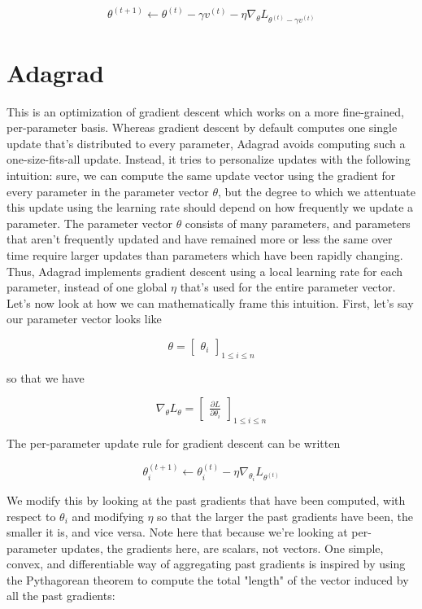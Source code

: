 \documentclass{article}
\begin{document}
    $$ \theta^{(t + 1)} \gets \theta^{(t)} - \gamma v^{(t)} - \eta \nabla_\theta L_{\theta^{(t)} - \gamma v^{(t)}} $$

\section{Adagrad}
This is an optimization of gradient descent which works on a more fine-grained, per-parameter basis. Whereas gradient descent by default computes one single update that's distributed to every parameter, Adagrad avoids computing such a one-size-fits-all update. Instead, it tries to personalize updates with the following intuition: sure, we can compute the same update vector using the gradient for every parameter in the parameter vector $ \theta $, but the degree to which we attentuate this update using the learning rate should depend on how frequently we update a parameter. The parameter vector $ \theta $ consists of many parameters, and parameters that aren't frequently updated and have remained more or less the same over time require larger updates than parameters which have been rapidly changing. Thus, Adagrad implements gradient descent using a local learning rate for each parameter, instead of one global $ \eta $ that's used for the entire parameter vector. Let's now look at how we can mathematically frame this intuition. First, let's say our parameter vector looks like

    $$ \theta = \begin{bmatrix} \theta_i \end{bmatrix}_{1 \leq i \leq n} $$

so that we have

    $$ \nabla_\theta L_\theta = \begin{bmatrix} \frac{\partial L}{\partial \theta_i} \end{bmatrix}_{1 \leq i \leq n} $$

The per-parameter update rule for gradient descent can be written

    $$ \theta^{(t + 1)}_i \gets \theta^{(t)}_i - \eta \nabla_{\theta_i} L_{\theta^{(t)}} $$

We modify this by looking at the past gradients that have been computed, with respect to $ \theta_i $ and modifying $ \eta $ so that the larger the past gradients have been, the smaller it is, and vice versa. Note here that because we're looking at per-parameter updates, the gradients here, are scalars, not vectors. One simple, convex, and differentiable way of aggregating past gradients is inspired by using the Pythagorean theorem to compute the total "length" of the vector induced by all the past gradients:
\end{document}
